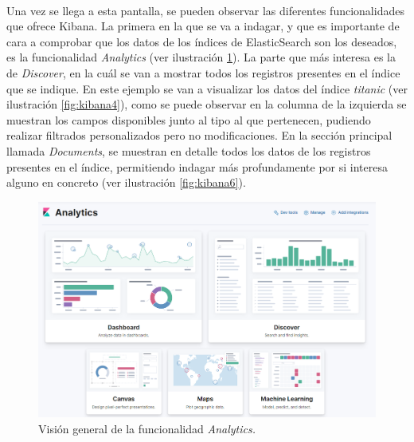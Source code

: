 \paragraph{}
\paragraph{}


Una vez se llega a esta pantalla, se pueden observar las diferentes funcionalidades que ofrece Kibana. La primera en la que se va a indagar, y que es importante de cara a comprobar que los datos de los índices de ElasticSearch son los deseados, es la funcionalidad \textit{Analytics} (ver ilustración \ref{fig:kibana3}). La parte que más interesa es la de \textit{Discover}, en la cuál se van a mostrar todos los registros presentes en el índice que se indique. En este ejemplo se van a visualizar los datos del índice \textit{titanic} (ver ilustración \ref{fig:kibana4}), como se puede observar en la columna de la izquierda se muestran los campos disponibles junto al tipo al que pertenecen, pudiendo realizar filtrados personalizados pero no modificaciones. En la sección principal llamada \textit{Documents}, se muestran en detalle todos los datos de los registros presentes en el índice, permitiendo indagar más profundamente por si interesa alguno en concreto (ver ilustración \ref{fig:kibana6}).

\begin{figure}
    \centering
    \includegraphics[width=1\linewidth]{img/kibana3.png}
    \caption{Visión general de la funcionalidad \textit{Analytics.}}
    \label{fig:kibana3}
\end{figure}

